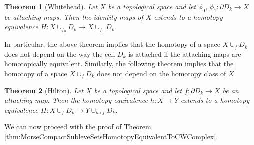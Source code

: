\documentclass[10pt]{article}
\theoremstyle{plain}
\newtheorem{thm}{Theorem}[section] %
\theoremstyle{definition}
\newcommand{\mysection}[1]{
    \setcounter{thm}{0}
    \section*{#1}
    \addcontentsline{toc}{section}{#1}
    \addtocounter{section}{1}
    \setcounter{subsection}{0}

}
\begin{document}
\begin{thm}[Whitehead]
    Let $X$ be a topological space and let $\phi_0,\,\phi_1:\partial D_k \to X$ be attaching maps. Then the identity maps of $X$ extends to a homotopy equivalence $H: X\cup_{f_0} D_k \to X \cup_{f_1} D_k$. 
\end{thm}
In particular, the above theorem implies that the homotopy of a space $X\cup_f D_k$ does not depend on the way the cell $D_k$ is attached if the attaching maps are homotopically equivalent. Similarly, the following theorem implies that the homotopy of a space $X\cup_f D_k$ does not depend on the homotopy class of $X$.
\begin{thm}[Hilton]
    Let $X$ be a topological space and let $f : \partial D_k \to X$ be an attaching map. Then the homotopy equivalence $h: X\to Y$ extends to a homotopy equivalence $H:X \cup_f D_k \to Y \cup_{h\circ f} D_k$.
\end{thm}
We can now proceed with the proof of Theorem \ref{thm:MorseCompactSubleveSetsHomotopyEquivalentToCWComplex}.
\end{document}

